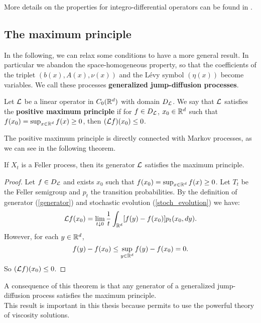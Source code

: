 More details on the properties for integro-differential operators can be found in \cite{Menaldi}.
  
  
\subsection{The maximum principle}
 
In the following, we can relax some conditions to have a more general result. In particular we abandon the space-homogeneous
property, so that the coefficients of the triplet $(b(x),A(x),\nu(x))$ and the Lévy symbol $(\eta(x))$ become variables.
We call these processes \textbf{generalized jump-diffusion processes}. 

\begin{Definition}\label{maximum_principle}
 Let $\mathcal{L}$ be a linear operator in $C_0(\mathbb{R}^d)$ with domain $D_{\mathcal{L}}$. We say that $\mathcal{L}$ satisfies the 
 \textbf{positive maximum principle} if for $f\in D_{\mathcal{L}}$, $x_0 \in \mathbb{R}^d$ such that $f(x_0) = \sup_{x\in \mathbb{R}^d} f(x) \geq 0$, then
 $(\mathcal{L} f)(x_0) \leq 0$.
\end{Definition}

The positive maximum principle is directly connected with Markov processes, as we can see in the following theorem.

\begin{Theorem}
 If $X_t$ is a Feller process, then its generator $\mathcal{L}$ satisfies the maximum principle.	
\end{Theorem}
\begin{proof}
 Let $f\in D_{\mathcal{L}}$ and exists $x_0$ such that $f(x_0) = \sup_{x\in \mathbb{R}^d} f(x) \geq 0$. Let $T_t$ be the Feller semigroup and $p_t$ 
 the transition probabilities. By the definition of generator (\ref{generator}) and stochastic evolution (\ref{stoch_evolution})
 we have:
$$ \mathcal{L} f(x_0) = \lim_{t \downarrow 0} \frac{1}{t} \int_{\mathbb{R}^d} [f(y) - f(x_0)]p_t(x_0,dy). $$
However, for each $y \in \mathbb{R}^d$,
$$ f(y) - f(x_0) \leq \sup_{y\in \mathbb{R}^d} f(y) - f(x_0) = 0. $$
So $(\mathcal{L} f)(x_0)\leq 0 $. 
\end{proof}

A consequence of this theorem is that any generator of a generalized jump-diffusion process satisfies the maximum principle.\\
This result is important in this thesis because permits to use the powerful theory of viscosity solutions.\\


